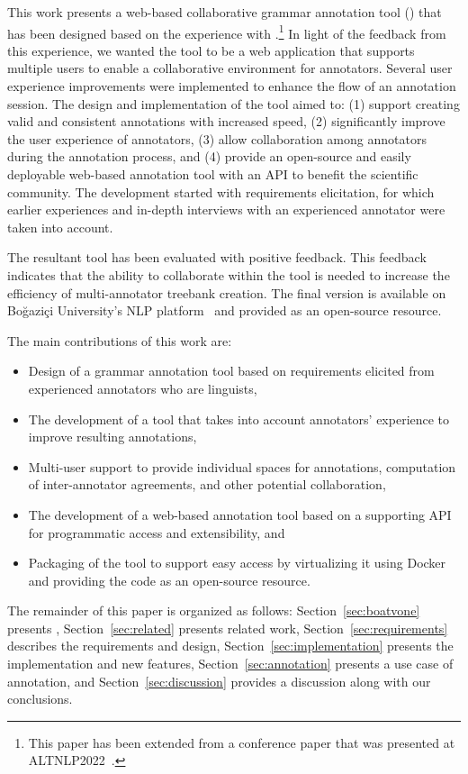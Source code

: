 This work presents a web-based collaborative grammar annotation tool (\boatvtwo) that has been designed based on the experience with \boatvone.\footnote{This paper has been extended from a conference paper that was presented at ALTNLP2022~\cite{ALTNLP}.}
In light of the feedback from this experience, we wanted the tool to be a web application that supports multiple users to enable a collaborative environment for annotators.
Several user experience improvements were implemented to enhance the flow of an annotation session.
The design and implementation of the tool aimed to: (1) support creating valid and consistent annotations with increased speed, (2) significantly improve the user experience of annotators, (3) allow collaboration among annotators during the annotation process, and (4) provide an open-source and easily deployable web-based annotation tool with an API to benefit the scientific community.
The development started with requirements elicitation, for which earlier experiences and in-depth interviews with an experienced annotator were taken into account.

The resultant tool has been evaluated with positive feedback.
This feedback indicates that the ability to collaborate within the tool is needed to increase the efficiency of multi-annotator treebank creation.
The final version is available on Boğaziçi University's NLP platform~\cite{TULAP} and provided as an open-source resource.

The main contributions of this work are:
\begin{itemize}
\setlength\itemsep{0em}
        \item Design of a grammar annotation tool based on requirements elicited from experienced annotators who are linguists,
        \item The development of a tool that takes into account annotators' experience to improve resulting annotations,
        \item Multi-user support to provide individual spaces for annotations, computation of inter-annotator agreements, and other potential collaboration,
        \item The development of a web-based annotation tool based on a supporting API for programmatic access and extensibility, and
        \item Packaging of the tool to support easy access by virtualizing it using Docker~\cite{docker} and providing the code as an open-source resource.
\end{itemize}

The remainder of this paper is organized as follows:
Section~\ref{sec:boatvone} presents \boatvone,
Section~\ref{sec:related} presents related work,
Section~\ref{sec:requirements} describes the requirements and design,
Section~\ref{sec:implementation} presents the implementation and new features,
Section~\ref{sec:annotation} presents a use case of annotation, and
Section~\ref{sec:discussion} provides a discussion along with our conclusions.
